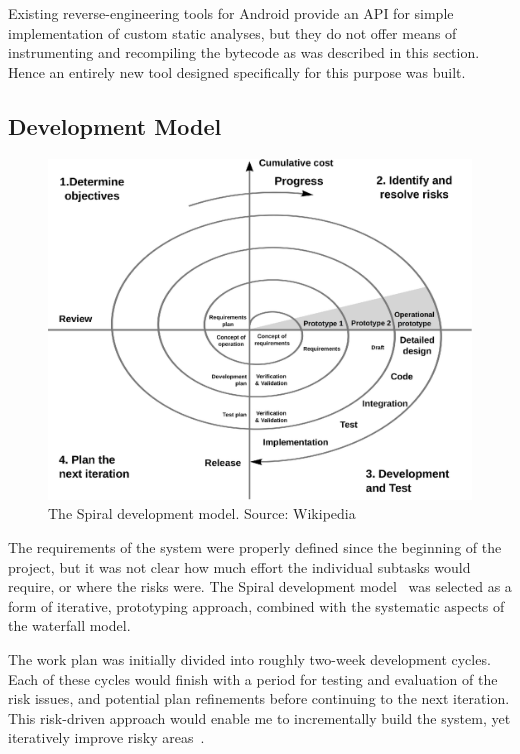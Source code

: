 \documentclass[12pt,twoside,notitlepage]{report}
\begin{document}
Existing reverse-engineering tools for Android provide an API for simple implementation of custom static analyses, but they do not offer means of instrumenting and recompiling the bytecode as was described in this section. Hence an entirely new tool designed specifically for this purpose was built.

\subsection{Development Model}

\begin{figure}[t]
	\centerline{	
		\includegraphics[width=1.1\textwidth]{figs/fig_prep_spiral.eps}
	}
	\caption{The Spiral development model. Source: Wikipedia}
	\label{fig:Preparation_Spiral}
\end{figure}

The requirements of the system were properly defined since the beginning of the project, but it was not clear how much effort the individual subtasks would require, or where the risks were. The Spiral development model~\cite{Boehm:1988:SMS:45797.45801} was selected as a form of iterative, prototyping approach, combined with the systematic aspects of the waterfall model. 

The work plan was initially divided into roughly two-week development cycles. Each of these cycles would finish with a period for testing and evaluation of the risk issues, and potential plan refinements before continuing to the next iteration. This risk-driven approach would enable me to incrementally build the system, yet iteratively improve risky areas~\cite{web:IncrementalVsIterative}.
\end{document}
